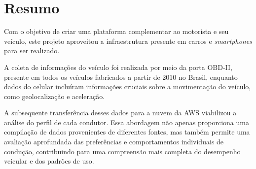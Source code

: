 \chapter*{Resumo}

Com o objetivo de criar uma plataforma complementar ao motorista e seu veículo, este projeto aproveitou a infraestrutura presente em carros e \textit{smartphones} para ser realizado.

A coleta de informações do veículo foi realizada por meio da porta OBD-II, presente em todos os veículos fabricados a partir de 2010 no Brasil, enquanto dados do celular incluíram informações cruciais sobre a movimentação do veículo, como geolocalização e aceleração.

A subsequente transferência desses dados para a nuvem da AWS viabilizou a análise do perfil de cada condutor. Essa abordagem não apenas proporciona uma compilação de dados provenientes de diferentes fontes, mas também permite uma avaliação aprofundada das preferências e comportamentos individuais de condução, contribuindo para uma compreensão mais completa do desempenho veicular e dos padrões de uso.

